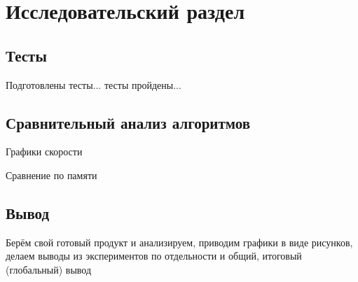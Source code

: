 \chapter{Исследовательский раздел}
\section{Тесты}
Подготовлены тесты... тесты пройдены...
\section{Сравнительный анализ алгоритмов}
Графики скорости

Сравнение по памяти

\section{Вывод}
Берём свой готовый продукт и анализируем, приводим графики в виде рисунков, делаем выводы из экспериментов по отдельности и общий, итоговый (глобальный) вывод